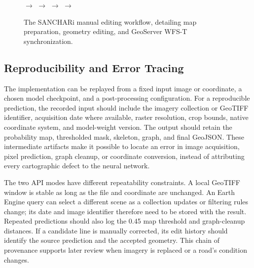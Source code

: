 \documentclass[10pt,a4paper,twocolumn]{article}
\begin{document}
\begin{figure}[t]
\centering
{}\hspace{0.15cm}$\longrightarrow$\hspace{0.15cm}
\hspace{0.15cm}$\longrightarrow$\hspace{0.15cm}
\hspace{0.15cm}$\longrightarrow$\hspace{0.15cm}
\hspace{0.15cm}$\longrightarrow$\hspace{0.15cm}
\caption{The SANCHARi manual editing workflow, detailing map preparation, geometry editing, and GeoServer WFS-T synchronization.}
\label{fig:manual_editing_workflow}
\end{figure}

\subsection{Reproducibility and Error Tracing}
The implementation can be replayed from a fixed input image or coordinate, a chosen model checkpoint, and a post-processing configuration. For a reproducible prediction, the recorded input should include the imagery collection or GeoTIFF identifier, acquisition date where available, raster resolution, crop bounds, native coordinate system, and model-weight version. The output should retain the probability map, thresholded mask, skeleton, graph, and final GeoJSON. These intermediate artifacts make it possible to locate an error in image acquisition, pixel prediction, graph cleanup, or coordinate conversion, instead of attributing every cartographic defect to the neural network.

The two API modes have different repeatability constraints. A local GeoTIFF window is stable as long as the file and coordinate are unchanged. An Earth Engine query can select a different scene as a collection updates or filtering rules change; its date and image identifier therefore need to be stored with the result. Repeated predictions should also log the 0.45 map threshold and graph-cleanup distances. If a candidate line is manually corrected, its edit history should identify the source prediction and the accepted geometry. This chain of provenance supports later review when imagery is replaced or a road's condition changes.
\end{document}
